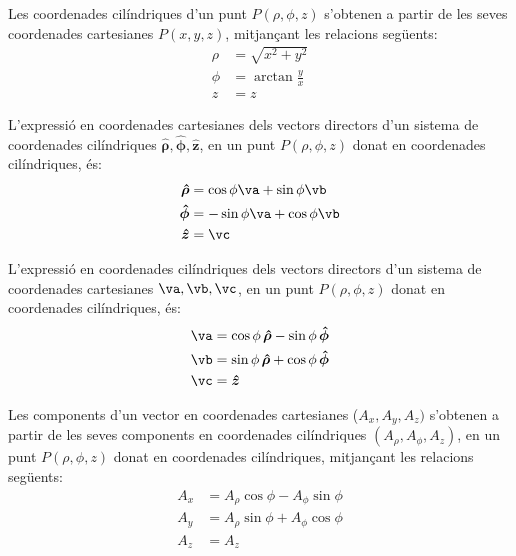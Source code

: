 \documentclass[catalan,a4paper,twoside,11pt]{article}
\begin{document}
Les coordenades  cilíndriques  d'un punt $P(\rho,\phi,z)$
s'obtenen a partir de les seves coordenades cartesianes $P(x,y,z)$,
mitjançant les relacions següents:
\begin{subequations}\begin{align}
    \rho &= \sqrt{x^2+y^2}\\
    \phi &=  \arctan\frac{y}{x}\\
    z &= z
\end{align}\end{subequations}

L'expressió en coordenades cartesianes dels vectors directors d'un sistema de coordenades  cilíndriques $\boldsymbol{\hat{\rho}},\boldsymbol{\hat{\phi}},\boldsymbol{\hat{z}}$, en un punt $P(\rho,\phi,z)$ donat en coordenades cilíndriques, és:
\begin{subequations}\begin{align}
    \boldsymbol{\hat{\rho}} &=\cos\phi\va+\sin\phi\vb \\
    \boldsymbol{\hat{\phi}} &=-\sin\phi\va+\cos\phi\vb \\
    \boldsymbol{\hat{z}} &=\vc
\end{align}\end{subequations}

L'expressió en coordenades cilíndriques dels vectors directors d'un sistema de coordenades  cartesianes $\va,\vb,\vc$, en un punt $P(\rho,\phi,z)$ donat en coordenades cilíndriques, és:
\begin{subequations}\begin{align}
    \va &=\cos\phi\,\boldsymbol{\hat{\rho}}-\sin\phi\,\boldsymbol{\hat{\phi}} \\
    \vb &=\sin\phi\,\boldsymbol{\hat{\rho}}+\cos\phi\,\boldsymbol{\hat{\phi}} \\
    \vc &=\boldsymbol{\hat{z}}
\end{align}\end{subequations}

Les components d'un vector en coordenades cartesianes ($A_x, A_y, A_z)$ s'obtenen a partir de les seves components en coordenades cilíndriques $(A_\rho, A_\phi, A_z)$, en un punt $P(\rho,\phi,z)$ donat en coordenades cilíndriques, mitjançant les relacions següents:
\begin{subequations}\begin{align}
    A_x &=A_\rho \cos\phi -A_\phi\sin\phi \\
    A_y &=A_\rho\sin\phi +A_\phi\cos\phi\\
    A_z &= A_z
\end{align}\end{subequations}
\end{document}
